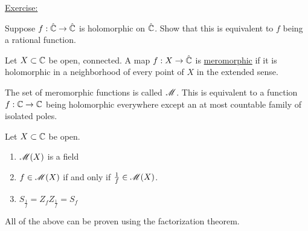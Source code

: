 \documentclass[x11names,reqno,14pt]{extarticle}
\begin{document}
\underline{Exercise:}

Suppose $f:\hat{\mathbb{C}}\to\hat{\mathbb{C}}$ is holomorphic on $\hat{\mathbb{C}}$. Show that this is equivalent to $f$ being a rational function. 


Let $X \subset \mathbb{C}$ be open, connected. A map $f:X\to\hat{\mathbb{C}}$ is \underline{meromorphic} if it is holomorphic in a neighborhood of every point of $X$ in the extended sense.   

The set of meromorphic functions is called $\mathscr{M}$. This is equivalent to a function $f:\mathbb{C}\to\mathbb{C}$ being holomorphic everywhere except an at most countable family of isolated poles. 

\prop

Let $X \subset \mathbb{C}$ be open. 
\begin{enumerate}[label=(\roman*)]
\item $\mathscr{M}(X)$ is a field
\item $f \in \mathscr{M}(X)$ if and only if $\frac{1}{f} \in \mathscr{M}(X)$. 
\item $S_{\frac{1}{f}} = Z_fZ_{\frac{1}{f}} = S_f$
\end{enumerate}

All of the above can be proven using the factorization theorem. 
\end{document}

